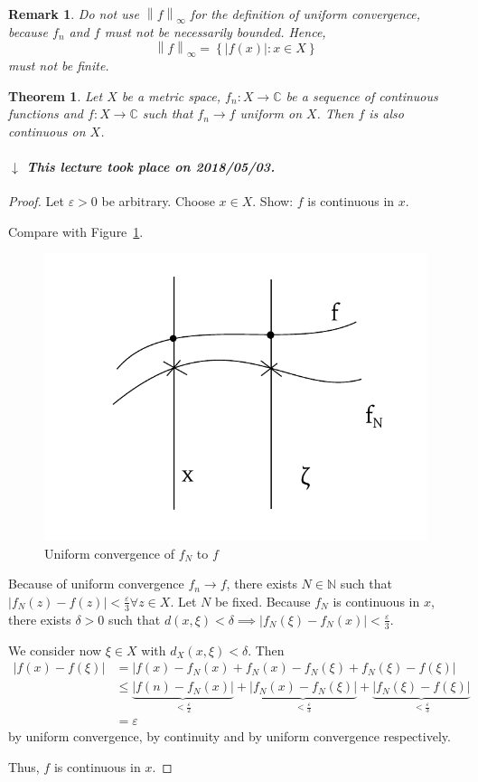 \documentclass{article}
\newtheorem{theorem}{Theorem}  \numberwithin{theorem}{section}
\newtheorem{remark}{Remark}  \numberwithin{remark}{section}
\newcommand{\set}[1]{\left\{#1\right\}}
\newcommand{\norm}[1]{\left\|#1\right\|}
\newcommand{\card}[1]{\left|#1\right|}
\newcommand{\dateref}[1]{%
  \begin{mdframed}[backgroundcolor=gray!10,innerbottommargin=0pt,innertopmargin=0pt]
    \paragraph{\textit{$\downarrow$ This lecture took place on #1.}}%
  \end{mdframed}%
}
\begin{document}
\begin{remark}
  Do not use $\norm{f}_{\infty}$ for the definition of uniform convergence,
  because $f_n$ and $f$ must not be necessarily bounded. Hence,
  \[ \norm{f}_\infty = \set{\card{f(x)}: x \in X} \]
  must not be finite.
\end{remark}

\begin{theorem} %
  \label{satz1cont}
  Let $X$ be a metric space, $f_n: X \to \mathbb C$ be a sequence of continuous functions and $f: X \to \mathbb C$ such that
  $f_n \to f$ uniform on $X$. Then $f$ is also continuous on $X$.
\end{theorem}

\dateref{2018/05/03}

\begin{proof}
  Let $\varepsilon > 0$ be arbitrary.
  Choose $x \in X$. Show: $f$ is continuous in $x$.

  Compare with Figure~\ref{img:uniconv}.

  \begin{figure}[t]
    \begin{center}
      \includegraphics[width=.4\textwidth]{img/25_uniform_convergence_of_fN_to_f.pdf}
      \caption{Uniform convergence of $f_N$ to $f$}
      \label{img:uniconv}
    \end{center}
  \end{figure}

  Because of uniform convergence $f_n \to f$, there exists $N \in \mathbb N$ such that $\card{f_N(z) - f(z)} < \frac\varepsilon3 \forall z \in X$.
  Let $N$ be fixed. Because $f_N$ is continuous in $x$, there exists $\delta > 0$ such that $d(x, \xi) < \delta \implies \card{f_N(\xi) - f_N(x)} < \frac\varepsilon3$.

  We consider now $\xi \in X$ with $d_X(x, \xi) < \delta$. Then
  \begin{align*}
    \card{f(x) - f(\xi)}
      &= \card{f(x) - f_N(x) + f_N(x) - f_N(\xi) + f_N(\xi) - f(\xi)} \\
      &\leq \underbrace{\card{f(n) - f_N(x)}}_{< \frac\varepsilon2} + \underbrace{\card{f_N(x) - f_N(\xi)}}_{< \frac\varepsilon3} + \underbrace{\card{f_N(\xi) - f(\xi)}}_{< \frac\varepsilon3} \\
      &= \varepsilon
  \end{align*}
  by uniform convergence, by continuity and by uniform convergence respectively.

  Thus, $f$ is continuous in $x$.
\end{proof}
\end{document}
